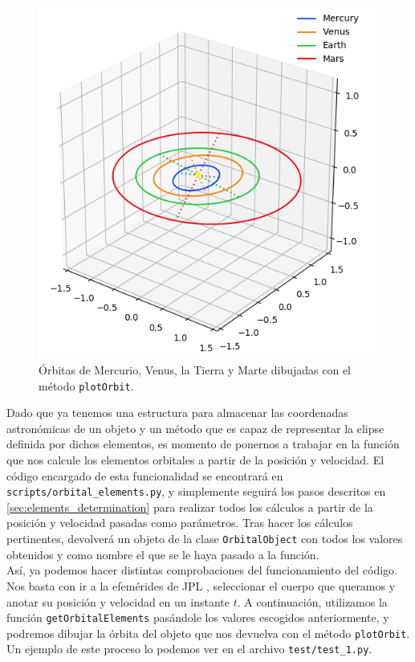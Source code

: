 \documentclass[11pt]{book}
\begin{document}
\begin{figure}[H]
\centering
\includegraphics[scale=0.4]{images/plot_example.png}
\caption{Órbitas de Mercurio, Venus, la Tierra y Marte dibujadas con el método \texttt{plotOrbit}.}
\label{fig:plot_example}
\end{figure}


Dado que ya tenemos una estructura para almacenar las coordenadas astronómicas de un objeto y un método que es capaz de representar la elipse definida por dichos elementos, es momento de ponernos a trabajar en la función que nos calcule los elementos orbitales a partir de la posición y velocidad. El código encargado de esta funcionalidad se encontrará en \texttt{scripts/orbital\_elements.py}, y simplemente seguirá los pasos descritos en \ref{sec:elements_determination} para realizar todos los cálculos a partir de la posición y velocidad pasadas como parámetros. Tras hacer los cálculos pertinentes, devolverá un objeto de la clase \texttt{OrbitalObject} con todos los valores obtenidos y como nombre el que se le haya pasado a la función.\\

Así, ya podemos hacer distintas comprobaciones del funcionamiento del código. Nos basta con ir a la efemérides de JPL \cite{jpl}, seleccionar el cuerpo que queramos y anotar su posición y velocidad en un instante $t$. A continuación, utilizamos la función \texttt{getOrbitalElements} pasándole los valores escogidos anteriormente, y podremos dibujar la órbita del objeto que nos devuelva con el método \texttt{plotOrbit}. Un ejemplo de este proceso lo podemos ver en el archivo \texttt{test/test\_1.py}.\\
\end{document}
